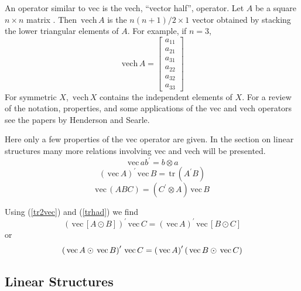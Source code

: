 \documentclass[12pt,thmsa,suthesis,verbatim]{report}
\begin{document}
An operator similar to vec is the vech, ``vector half'', operator. Let $A$
be a square $n\times n$ matrix . Then $\,\mathrm{vech}\,A$ is the $n\left(
n+1\right) /2\times 1$ vector obtained by stacking the lower triangular
elements of $A$. For example, if $n=3$, 
\begin{equation}
\,\mathrm{vech}\,A=\left[ 
\begin{array}{c}
a_{11} \\ 
a_{21} \\ 
a_{31} \\ 
a_{22} \\ 
a_{32} \\ 
a_{33}
\end{array}
\right]
\end{equation}
For symmetric $X$, $\,\mathrm{vech}\,X$ contains the independent elements of 
$X$. For a review of the notation, properties, and some applications of the
vec and vech operators see the papers by Henderson and Searle\cite
{HendersonSearle79,HendersonSearle80}.

Here only a few properties of the vec operator are given. In the section on
linear structures many more relations involving vec and vech will be
presented. 
\begin{equation}
\,\mathrm{vec}\,ab^{\prime }=b\otimes a
\end{equation}
\begin{equation}
\left( \,\mathrm{vec}\,A\right) ^{\prime }\,\mathrm{vec}\,B=\,\mathrm{tr}%
\,\left( A^{\prime }B\right)  \label{tr2vec}
\end{equation}
$\,$%
\begin{equation}
\mathrm{vec}\,\left( ABC\right) =\left( C^{\prime }\otimes A\right) \,%
\mathrm{vec}\,B  \label{vecabc}
\end{equation}

Using (\ref{tr2vec}) and (\ref{trhad}) we find 
\begin{equation}
\left( \,\mathrm{vec}\,\left[ A\odot B\right] \right) ^{\prime }\,\mathrm{vec%
}\,C=\left( \,\mathrm{vec}\,A\right) ^{\prime }\,\mathrm{vec}\,\left[ B\odot
C\right]
\end{equation}
or 
\begin{equation}
\left( \,\mathrm{vec}\,A\odot \,\mathrm{vec}\,B\right) ^{\prime }\,\mathrm{%
vec}\,C=\left( \,\mathrm{vec}\,A\right) ^{\prime }\left( \,\mathrm{vec}%
\,B\odot \,\mathrm{vec}\,C\right)  \label{vechad}
\end{equation}

\subsection{Linear Structures}
\end{document}

